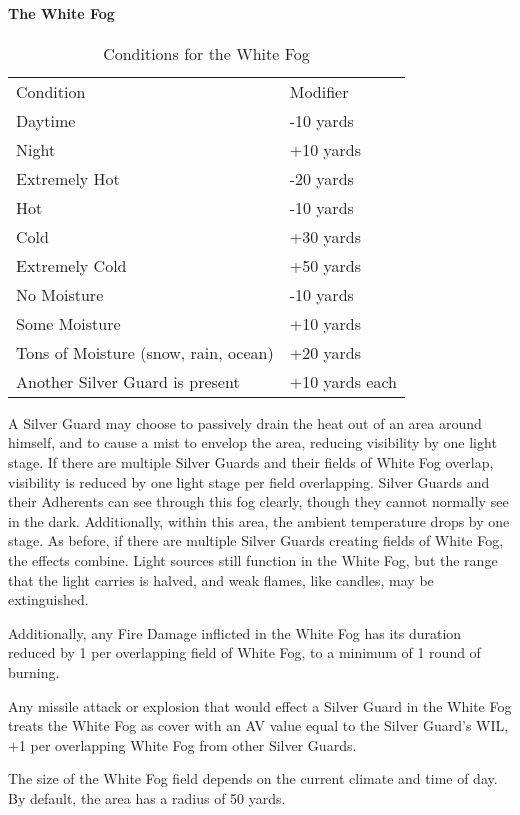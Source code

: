 \documentclass[oneside,11pt,english]{book}
\begin{document}
\paragraph{The White Fog}
\begin{wraptable}{r}{9 cm}
	\caption{Conditions for the White Fog}
	\label{tab:Dessian_White_Fog}
	\begin{tabu} spread 0pt {Xl}
		Condition& Modifier\\
		Daytime& -10 yards\\
		Night& +10 yards\\
		Extremely Hot& -20 yards \\
		Hot& -10 yards \\
		Cold& +30 yards \\
		Extremely Cold& +50 yards \\
		No Moisture& -10 yards \\
		Some Moisture& +10 yards \\
		Tons of Moisture (snow, rain, ocean)& +20 yards \\
		Another Silver Guard is present& +10 yards each \\
	\end{tabu}
\end{wraptable}
A Silver Guard may choose to passively drain the heat out of an area around himself, and to cause 
a mist to envelop the area, reducing visibility by one light stage. If there are multiple Silver 
Guards and their fields of White Fog overlap, visibility is reduced by one light stage per field 
overlapping. Silver Guards and their Adherents can see through this fog clearly, though they 
cannot normally see in the dark. Additionally, within this area, the ambient temperature drops by 
one stage. As before, if there are multiple Silver Guards creating fields of White Fog, the effects 
combine. Light sources still function in the White Fog, but the range that the light carries is 
halved, and weak flames, like candles, may be extinguished. 


Additionally, any Fire Damage inflicted in the White Fog has its duration reduced by 1 per 
overlapping field of White Fog, to a minimum of 1 round of burning. 


Any missile attack or explosion that would effect a Silver Guard in the White Fog treats the White Fog as cover with an AV value equal to the Silver Guard's WIL, +1 per overlapping White Fog from other Silver Guards. 


The size of the White Fog field depends on the current climate and time of day. By default, the area has a radius of 50 yards.
\end{document}
